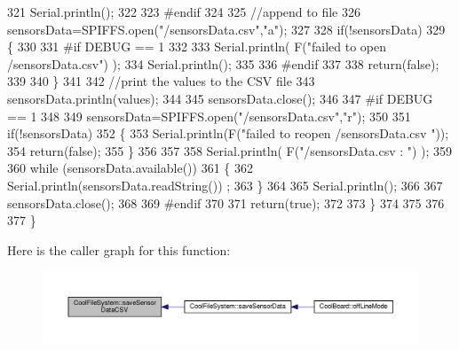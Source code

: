 \begin{DoxyCode}
321         Serial.println();
322     
323 \textcolor{preprocessor}{    #endif}
324 
325         \textcolor{comment}{//append to file}
326         sensorsData=SPIFFS.open(\textcolor{stringliteral}{"/sensorsData.csv"},\textcolor{stringliteral}{"a"});
327         
328         \textcolor{keywordflow}{if}(!sensorsData)
329         \{
330         
331 \textcolor{preprocessor}{        #if DEBUG == 1}
332             
333             Serial.println( F(\textcolor{stringliteral}{"failed to open /sensorsData.csv"}) );
334             Serial.println();
335 
336 \textcolor{preprocessor}{        #endif}
337             
338             \textcolor{keywordflow}{return}(\textcolor{keyword}{false});
339         
340         \}
341 
342         \textcolor{comment}{//print the values to the CSV file}
343         sensorsData.println(values);
344         
345         sensorsData.close();
346 
347 \textcolor{preprocessor}{    #if DEBUG == 1}
348 
349         sensorsData=SPIFFS.open(\textcolor{stringliteral}{"/sensorsData.csv"},\textcolor{stringliteral}{"r"});
350         
351         \textcolor{keywordflow}{if}(!sensorsData)
352         \{
353             Serial.println(F(\textcolor{stringliteral}{"failed to reopen /sensorsData.csv "}));
354             \textcolor{keywordflow}{return}(\textcolor{keyword}{false});      
355         \}
356 
357         
358         Serial.println( F(\textcolor{stringliteral}{"/sensorsData.csv : "}) );
359 
360         \textcolor{keywordflow}{while} (sensorsData.available()) 
361         \{
362             Serial.println(sensorsData.readString()) ;
363         \}
364         
365         Serial.println();
366         
367         sensorsData.close();
368         
369 \textcolor{preprocessor}{    #endif      }
370         
371         \textcolor{keywordflow}{return}(\textcolor{keyword}{true});
372     
373     \}   
374 
375 
376 
377 \}
\end{DoxyCode}
Here is the caller graph for this function\+:\nopagebreak
\begin{figure}[H]
\begin{center}
\leavevmode
\includegraphics[width=350pt]{db/d0c/class_cool_file_system_ab78704d5d21ce10fc6f1138ab5ab46c8_icgraph}
\end{center}
\end{figure}
\mbox{\label{class_cool_file_system_adfa8e2e80641ae6f0cceabd348a9b841}} 
